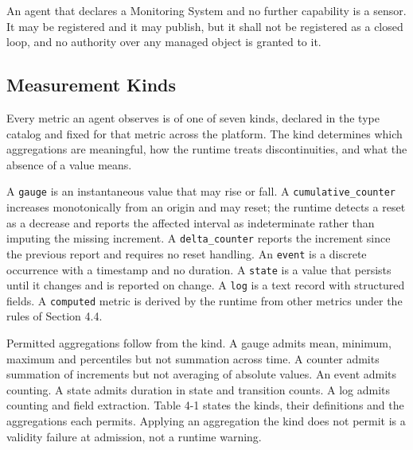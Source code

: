 An agent that declares a Monitoring System and no further capability is
a sensor. It may be registered and it may publish, but it shall not be
registered as a closed loop, and no authority over any managed object is
granted to it.

\hypertarget{measurement-kinds}{%
\subsection{Measurement Kinds}\label{measurement-kinds}}

Every metric an agent observes is of one of seven kinds, declared in the
type catalog and fixed for that metric across the platform. The kind
determines which aggregations are meaningful, how the runtime treats
discontinuities, and what the absence of a value means.

A \texttt{gauge} is an instantaneous value that may rise or fall. A
\texttt{cumulative\_\allowbreak{}counter} increases monotonically from an origin and
may reset; the runtime detects a reset as a decrease and reports the
affected interval as indeterminate rather than imputing the missing
increment. A \texttt{delta\_\allowbreak{}counter} reports the increment since the
previous report and requires no reset handling. An \texttt{event} is a
discrete occurrence with a timestamp and no duration. A \texttt{state}
is a value that persists until it changes and is reported on change. A
\texttt{log} is a text record with structured fields. A
\texttt{computed} metric is derived by the runtime from other metrics
under the rules of Section 4.4.

Permitted aggregations follow from the kind. A gauge admits mean,
minimum, maximum and percentiles but not summation across time. A
counter admits summation of increments but not averaging of absolute
values. An event admits counting. A state admits duration in state and
transition counts. A log admits counting and field extraction. Table 4-1
states the kinds, their definitions and the aggregations each permits.
Applying an aggregation the kind does not permit is a validity failure
at admission, not a runtime warning.


